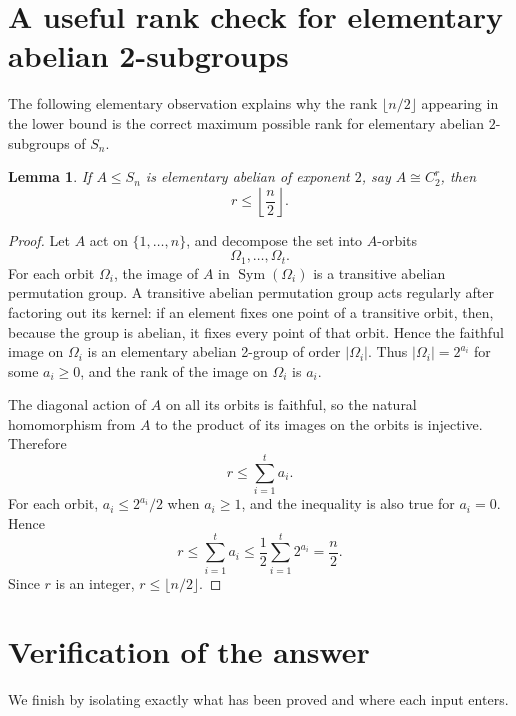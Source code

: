 \documentclass[a4paper,11pt]{amsart}
\newtheorem{lemma}[theorem]{Lemma}
\theoremstyle{remark}
\newcommand{\Sym}{\operatorname{Sym}}
\begin{document}
\section{A useful rank check for elementary abelian 2-subgroups}

The following elementary observation explains why the rank \(\lfloor n/2\rfloor\) appearing in the
lower bound is the correct maximum possible rank for elementary abelian \(2\)-subgroups of \(S_n\).

\begin{lemma}\label{lem:rank-bound}
If \(A\leq S_n\) is elementary abelian of exponent \(2\), say \(A\cong C_2^r\), then
\[
        r\leq \left\lfloor\frac n2\right\rfloor.
\]
\end{lemma}

\begin{proof}
Let \(A\) act on \(\{1,\ldots,n\}\), and decompose the set into \(A\)-orbits
\[
        \Omega_1,\ldots,\Omega_t.
\]
For each orbit \(\Omega_i\), the image of \(A\) in \(\Sym(\Omega_i)\) is a transitive abelian
permutation group. A transitive abelian permutation group acts regularly after factoring out its
kernel: if an element fixes one point of a transitive orbit, then, because the group is abelian, it
fixes every point of that orbit. Hence the faithful image on \(\Omega_i\) is an elementary abelian
2-group of order \(|\Omega_i|\). Thus \(|\Omega_i|=2^{a_i}\) for some \(a_i\geq 0\), and the rank
of the image on \(\Omega_i\) is \(a_i\).

The diagonal action of \(A\) on all its orbits is faithful, so the natural homomorphism from \(A\)
to the product of its images on the orbits is injective. Therefore
\[
        r\leq \sum_{i=1}^t a_i.
\]
For each orbit, \(a_i\leq 2^{a_i}/2\) when \(a_i\geq 1\), and the inequality is also true for
\(a_i=0\). Hence
\[
        r\leq \sum_{i=1}^t a_i
        \leq
        \frac12\sum_{i=1}^t 2^{a_i}
        =\frac n2.
\]
Since \(r\) is an integer, \(r\leq\lfloor n/2\rfloor\).
\end{proof}

\section{Verification of the answer}

We finish by isolating exactly what has been proved and where each input enters.
\end{document}
